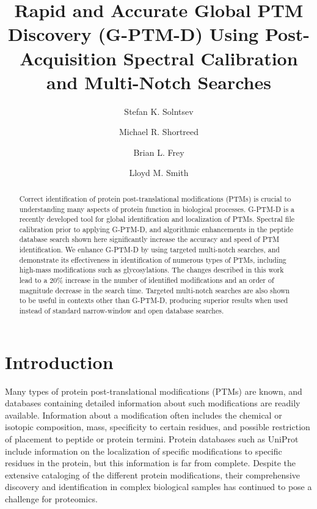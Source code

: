 \documentclass[journal=jprobs,manuscript=article]{achemso}
\author{Stefan K. Solntsev}
\author{Michael R. Shortreed}
\author{Brian L. Frey}
\author{Lloyd M. Smith}
\affiliation[UwMadison]
{University of Wisconsin-Madison}
\title[Rapid and Accurate Global PTM Discovery (G-PTM-D) Using Post-Acquisition Spectral Calibration and Multi-Notch Searches]
  {Rapid and Accurate Global PTM Discovery (G-PTM-D) Using Post-Acquisition Spectral Calibration and Multi-Notch Searches}
\begin{document}
\begin{abstract}

Correct identification of protein post-translational modifications (PTMs) is crucial to understanding many aspects of protein function in biological processes.
G-PTM-D\citep{Li_2016} is a recently developed tool for global identification and localization of PTMs.
Spectral file calibration prior to applying G-PTM-D, and algorithmic enhancements in the peptide database search shown here significantly increase the accuracy and speed of PTM identification.
We enhance G-PTM-D by using targeted multi-notch searches, and demonstrate its effectiveness in identification of numerous types of PTMs, including high-mass modifications such as glycosylations.
The changes described in this work lead to a 20\% increase in the number of identified modifications and an order of magnitude decrease in the search time.
Targeted multi-notch searches are also shown to be useful in contexts other than G-PTM-D, producing superior results when used instead of standard narrow-window and open database searches.
\end{abstract}

\section{Introduction}

Many types of protein post-translational modifications (PTMs) are known, and databases containing detailed information about such modifications are readily available\citep{Creasy_2004}.
Information about a modification often includes the chemical or isotopic composition, mass, specificity to certain residues, and possible restriction of placement to peptide or protein termini.
Protein databases such as UniProt\citep{Uniprot_2017} include information on the localization of specific modifications to specific residues in the protein, but this information is far from complete.
Despite the extensive cataloging of the different protein modifications, their comprehensive discovery and identification in complex biological samples has continued to pose a challenge for proteomics\citep{Olsen_2013}.
\end{document}
